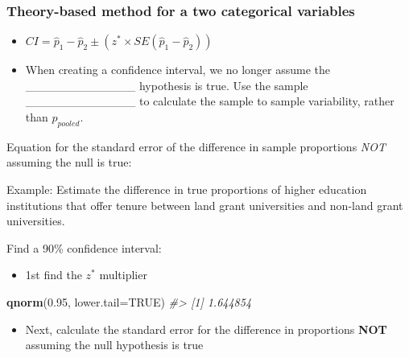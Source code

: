 \documentclass[
]{report}
\newenvironment{Shaded}{\begin{snugshade}}{\end{snugshade}}
\newcommand{\AttributeTok}[1]{\textcolor[rgb]{0.13,0.29,0.53}{#1}}
\newcommand{\CommentTok}[1]{\textcolor[rgb]{0.56,0.35,0.01}{\textit{#1}}}
\newcommand{\ConstantTok}[1]{\textcolor[rgb]{0.56,0.35,0.01}{#1}}
\newcommand{\FloatTok}[1]{\textcolor[rgb]{0.00,0.00,0.81}{#1}}
\newcommand{\FunctionTok}[1]{\textcolor[rgb]{0.13,0.29,0.53}{\textbf{#1}}}
\newcommand{\NormalTok}[1]{#1}
\providecommand{\tightlist}{%
  \setlength{\itemsep}{0pt}\setlength{\parskip}{0pt}}
\begin{document}
\hypertarget{theory-based-method-for-a-two-categorical-variables}{%
\subsubsection*{Theory-based method for a two categorical variables}\label{theory-based-method-for-a-two-categorical-variables}}

\begin{itemize}
\tightlist
\item
  \(CI = \hat{p}_1-\hat{p}_2 \pm (z^* \times SE(\hat{p}_1-\hat{p}_2))\)
\end{itemize}


\begin{itemize}
\tightlist
\item
  When creating a confidence interval, we no longer assume the \_\_\_\_\_\_\_\_\_\_\_\_\_ hypothesis is true. Use the sample \_\_\_\_\_\_\_\_\_\_\_\_\_ to calculate the sample to sample variability, rather than \(\hat{p}_{pooled}\).
\end{itemize}


Equation for the standard error of the difference in sample proportions \emph{NOT} assuming the null is true:

\vspace{0.5in}

Example: Estimate the difference in true proportions of higher education institutions that offer tenure between land grant universities and non-land grant universities.

Find a 90\% confidence interval:

\begin{itemize}
\tightlist
\item
  1st find the \(z^*\) multiplier
\end{itemize}

\begin{Shaded}
\begin{Highlighting}[]
\FunctionTok{qnorm}\NormalTok{(}\FloatTok{0.95}\NormalTok{, }\AttributeTok{lower.tail=}\ConstantTok{TRUE}\NormalTok{)}
\CommentTok{\#\textgreater{} [1] 1.644854}
\end{Highlighting}
\end{Shaded}

\begin{itemize}
\tightlist
\item
  Next, calculate the standard error for the difference in proportions \textbf{NOT} assuming the null hypothesis is true
\end{itemize}
\end{document}
